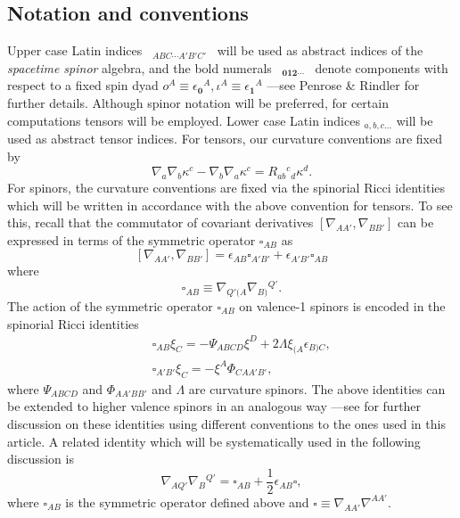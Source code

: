 \documentclass[10pt,a4paper]{article}
\theoremstyle{plain}
\begin{document}
 \subsection*{Notation and conventions}
Upper case Latin indices ~$_{ABC\cdots A'B'C'}$~ will be used as
abstract indices of the \emph{spacetime spinor} algebra, and the bold
numerals ~$_{\bm0\bm1\bm2\cdots}$~ denote components with respect to a
fixed spin dyad $ o^A\equiv
\epsilon_{\bm0}{}^A,\iota^A\equiv\epsilon_{\bm1}{}^A $ ---see Penrose
\& Rindler \cite{PenRin84} for further details.  Although spinor
notation will be preferred, for certain computations tensors will be
employed. Lower case Latin indices $_{a,b,c...}$ will be used as
abstract tensor indices.  For tensors, our curvature conventions are
fixed by
\[\nabla_{a}\nabla_{b}\kappa^c-\nabla_{b}\nabla_{a}\kappa^c=R_{ab}{}^{c}{}_{d}\kappa^{d}.\]
For spinors, the curvature conventions are fixed via the spinorial
Ricci identities which will be written in accordance with the above
convention for tensors.  To see this, recall that the commutator of
covariant derivatives $[ \nabla_{AA'},\nabla_{BB'}]$ can be expressed
in terms of the symmetric operator $\square_{AB}$ as
\[
[ \nabla_{AA'},\nabla_{BB'}]= \epsilon_{AB}\square_{A'B'} +
\epsilon_{A'B'}\square_{AB}
\]
where
\[
\square_{AB} \equiv \nabla_{Q'(A} \nabla_{B)}{}^{Q'}.
\]
 The action of the symmetric operator $\square_{AB}$ on valence-1
 spinors is encoded in the spinorial Ricci identities
\begin{subequations}
\begin{eqnarray}
&& \square_{AB}\xi_{C}=-\Psi_{ABCD} \xi^{D} +
  2\Lambda\xi_{(A}\epsilon_{B)C},
 \label{SpinorialRicciIdentities1} \\
&& \square_{A'B'}\xi_{C}=-\xi^{A}\Phi_{CA A' B'},
\label{SpinorialRicciIdentities2}
\end{eqnarray}
\end{subequations}
where $\Psi_{ABCD}$ and $\Phi_{AA'BB'}$ and $\Lambda$ are curvature spinors.
 The above identities can be extended to higher valence spinors in an
 analogous way ---see \cite{Ste91} for further discussion on these
 identities using different conventions to the ones used in this
 article. A related identity which will be systematically used in the
 following discussion is
\begin{equation}\label{DecomposeDoubleDerivativeContracted}
\nabla_{AQ'}\nabla_{B}{}^{Q'}=\square_{AB}+
\frac{1}{2}\epsilon_{AB}\square,
\end{equation}
where $\square_{AB}$ is the symmetric operator defined above and
$\square \equiv \nabla_{AA'}\nabla^{AA'}.$
\end{document}
